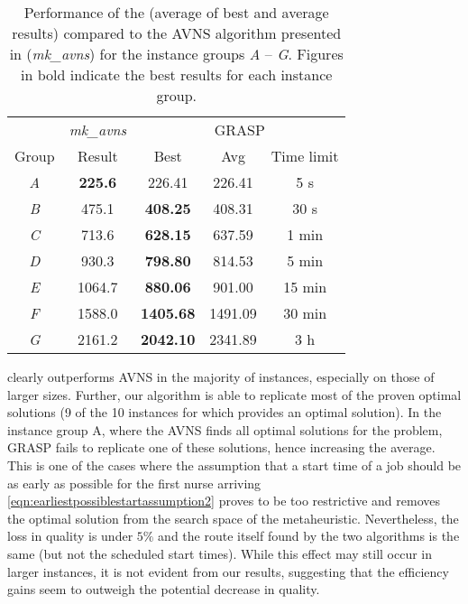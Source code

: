 \documentclass[a4paper,11pt,authoryear]{elsarticle}
\begin{document}
\begin{table}
	\centering
	\caption{Performance of the  (average of best and average results) compared to the AVNS algorithm presented in \citet{mankowska2014} (\emph{mk\_avns}) for the instance groups \emph{A} -- \emph{G}. Figures in bold indicate the best results for each instance group. }
	\begin{tabular}{c|c|ccc}
		\toprule
		        &  \emph{mk\_avns}    &   \multicolumn{3}{c}{GRASP} \\
		Group   &   Result    &   Best        &   Avg         &   Time limit\\
		\midrule
		\emph{A}    &   \textbf{225.6}  &   226.41  &   226.41      &   5 s\\
		\emph{B}    &   475.1   &   \textbf{408.25} &   408.31      &   30 s\\
		\emph{C}    &   713.6   &   \textbf{628.15} &   637.59      &   1 min\\
		\emph{D}    &   930.3   &   \textbf{798.80}  &   814.53      &   5 min\\
		\emph{E}    &   1064.7  &   \textbf{880.06} &   901.00       &   15 min\\
		\emph{F}    &   1588.0    &   \textbf{1405.68}&   1491.09     &   30 min\\
		\emph{G}    &   2161.2  &   \textbf{2042.10} &   2341.89     &   3 h\\
		\bottomrule
	\end{tabular}
	\label{table:grouptablemkavgbest}
\end{table}

 clearly outperforms AVNS in the majority of instances, especially on those of larger sizes.
Further, our algorithm is able to replicate most of the proven optimal solutions (9 of the 10 instances for which \cite{mankowska2014} provides an optimal solution). In the instance group A, where the AVNS finds all optimal solutions for the problem, GRASP fails to replicate one of these solutions, hence increasing the average. This is one of the cases where the assumption that a start time of a job should be as early as possible for the first nurse arriving \eqref{eqn:earliestpossiblestartassumption2} proves to be too restrictive and removes the optimal solution from the search space of the metaheuristic. Nevertheless, the loss in quality is under $5\%$ and the route itself found by the two algorithms is the same (but not the scheduled start times). While this effect may still occur in larger instances, it is not evident from our results, suggesting that the efficiency gains seem to outweigh the potential decrease in quality.
\end{document}
